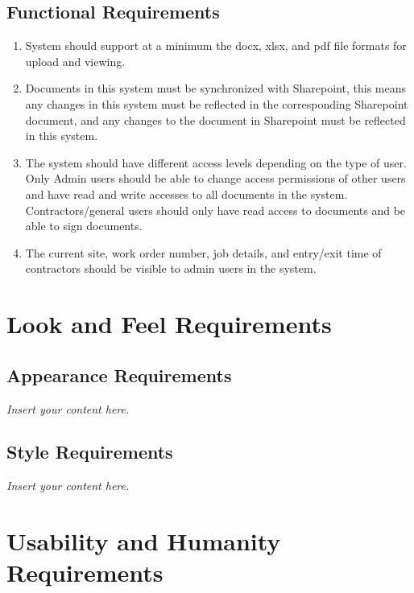 \documentclass[12pt]{article}
\newcommand{\lips}{\textit{Insert your content here.}}
\begin{document}
\subsection{Functional Requirements}
\begin{enumerate} [{FR}1.]
  \item System should support at a minimum the docx, xlsx, and pdf file formats for
        upload and viewing.
  \item Documents in this system must be synchronized with Sharepoint, this means any
        changes in this system must be reflected in the corresponding Sharepoint
        document, and any changes to the document in Sharepoint must be reflected in
        this system.
  \item The system should have different access levels depending on the type of user.
        Only Admin users should be able to change access permissions of other users and
        have read and write accesses to all documents in the system.
        Contractors/general users should only have read access to documents and be able
        to sign documents.
  \item The current site, work order number, job details, and entry/exit time of 
        contractors should be visible to admin users in the system.
\end{enumerate}

\section{Look and Feel Requirements}
\subsection{Appearance Requirements}
\lips
\subsection{Style Requirements}
\lips

\section{Usability and Humanity Requirements}
\end{document}
